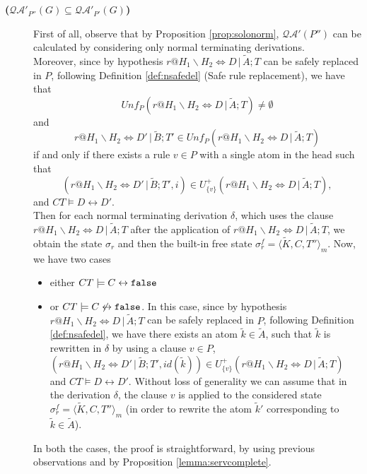 \documentclass[final]{acmtrans2e}
\newcommand{\la}{\langle}
\newcommand{\ra}{\rangle}
\begin{document}
\begin{description}
  \item[{\bf ($\mathcal{QA'}_{P''}(G) \subseteq \mathcal{QA'}_{P'}(G)$) }]
  First of all, observe that by Proposition \ref{prop:solonorm},
  $\mathcal{QA'}(P'')$ can be calculated by
considering only normal terminating derivations. \\
Moreover, since  by hypothesis
$r@H_1\backslash H_2 \Leftrightarrow D\,|\,\tilde A; T$ can be safely replaced
in $P$, following Definition \ref{def:nsafedel} (Safe rule replacement), we have that
\[Unf_{P}(r@H_1\backslash H_2 \Leftrightarrow D\,|\,\tilde A; T) \neq \emptyset\]
and
\[ r@ H_1\backslash H_2
\Leftrightarrow D'\, | \,\tilde B; T' \in
     Unf_{P}(r@H_1\backslash H_2 \Leftrightarrow D\,|\,\tilde A; T)\] if and only if there exists a rule
     $v\in P$ with a single atom in the head such that
 \[ (r@ H_1\backslash H_2 \Leftrightarrow D' \, |\, \tilde B; T', i)
\in U^{+}_{\{v \}}(r@H_1\backslash H_2 \Leftrightarrow D\,|\,\tilde A; T ),\]
and $CT \models D \leftrightarrow D'$.\\
Then for each normal terminating derivation $\delta$, which uses the clause $r@H_1\backslash H_2 \Leftrightarrow D\,|\,\tilde A; T$ after the application of $r@H_1\backslash H_2 \Leftrightarrow D\,|\,\tilde A; T$, we obtain the state $\sigma_{r}$ and then the built-in free state $\sigma_{r}^f=\la \tilde K, C , T''\ra _{m}$. Now, we have two cases

\begin{itemize}
\item either $CT \models C \leftrightarrow \tt false$
\item or $CT \models C \not \leftrightarrow \tt false$. In this case, since by hypothesis
$r@H_1\backslash H_2 \Leftrightarrow D\,|\,\tilde A; T$ can be safely replaced
in $P$, following Definition \ref{def:nsafedel}, we have there exists an atom
$\tilde k \in \tilde A$, such that $\tilde k$ is rewritten in $\delta$ by using a clause $v \in P$,
$(r@ H_1\backslash H_2 \Leftrightarrow D' \, |\, \tilde B; T', id(\tilde k))
\in U^{+}_{\{v \}}(r@H_1\backslash H_2 \Leftrightarrow D\,|\,\tilde A; T )$ and $CT \models D \leftrightarrow D'$.
Without loss of generality we can assume that in the derivation $\delta$, the clause $v$ is applied to the considered state $\sigma_{r}^f=\la \tilde K, C , T''\ra _{m}$ (in order to rewrite the atom $\tilde k'$ corresponding to $\tilde k\in \tilde A$).

\end{itemize}
In both the cases, the proof is straightforward, by using previous observations and by Proposition \ref{lemma:servcomplete}.
\end{description}
\end{document}

